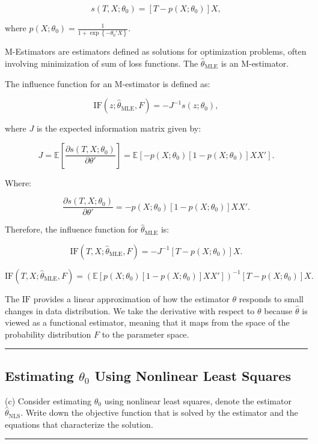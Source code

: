 \documentclass{article}
\newenvironment{colorparagraph}[1]{\par\color{#1}}{\par}
\begin{document}
\[
s(T, X; \theta_0) = [T - p(X; \theta_0)] X,
\]

where \( p(X; \theta_0) = \frac{1}{1 + \exp\left\{ - \theta_0' X \right\}} \).

M-Estimators are estimators defined as solutions for optimization problems, often involving minimization of sum of loss functions. The \( \hat{\theta}_{\text{MLE}} \) is an M-estimator.

The influence function for an M-estimator is defined as:

\[
\text{IF}(z; \hat{\theta}_{\text{MLE}}, F) = -J^{-1} s(z; \theta_0),
\]

where \( J \) is the expected information matrix given by:

\[
J = \mathbb{E}\left[ \frac{\partial s(T, X; \theta_0)}{\partial \theta'} \right] = \mathbb{E}\left[- p(X; \theta_0)[1 - p(X; \theta_0)] X X' \right].
\]

Where:

$$
\frac{\partial s(T, X; \theta_0)}{\partial \theta{\prime}} = -p(X; \theta_0)[1 - p(X; \theta_0)] X X'.
$$

Therefore, the influence function for \( \hat{\theta}_{\text{MLE}} \) is:

\[
\text{IF}(T, X; \hat{\theta}_{\text{MLE}}, F) = -J^{-1} [T - p(X; \theta_0)] X.
\]

\[
\text{IF}(T, X; \hat{\theta}_{\text{MLE}}, F) = \left( \mathbb{E}\left[ p(X; \theta_0) \left[ 1 - p(X; \theta_0) \right] X X' \right] \right)^{-1} \left[ T - p(X; \theta_0) \right] X.
\]

The $\text{IF}$ provides a linear approximation of how the estimator $\theta$ responds to small changes in data distribution. We take the derivative with respect to $\theta$ because $\hat{\theta}$ is viewed as a functional estimator, meaning that it maps from the space of the probability distribution $F$ to the parameter space.

\begin{colorparagraph}{questioncolor}
\label{q1c}
\rule{\textwidth}{0.5pt}
\subsection{Estimating \( \theta_0 \) Using Nonlinear Least Squares}
(c) Consider estimating \( \theta_0 \) using nonlinear least squares, denote the estimator \( \hat{\theta}_{\text{NLS}} \).
Write down the objective function that is solved by the estimator and the equations that characterize the solution.

\rule{\textwidth}{0.5pt}
\end{colorparagraph}
\end{document}
